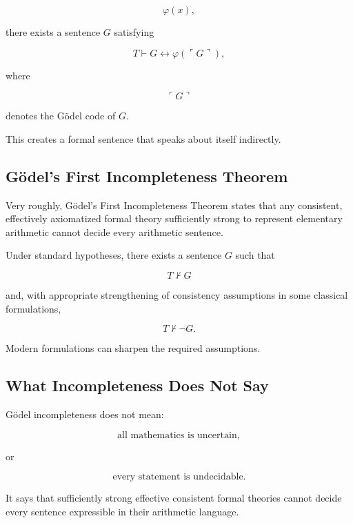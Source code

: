 \[
\varphi(x),
\]

there exists a sentence \(G\) satisfying

\[
\boxed{
T\vdash
G
\leftrightarrow
\varphi(\ulcorner G\urcorner),
}
\]

where

\[
\ulcorner G\urcorner
\]

denotes the Gödel code of \(G\).

This creates a formal sentence that speaks about itself indirectly.

\subsection{Gödel's First Incompleteness Theorem}
\label{subsec:first-incompleteness}

Very roughly, Gödel's First Incompleteness Theorem states that any
consistent, effectively axiomatized formal theory sufficiently strong to
represent elementary arithmetic cannot decide every arithmetic sentence.

Under standard hypotheses, there exists a sentence \(G\) such that

\[
\boxed{
T\nvdash G
}
\]

and, with appropriate strengthening of consistency assumptions in some
classical formulations,

\[
\boxed{
T\nvdash\neg G.
}
\]

Modern formulations can sharpen the required assumptions.

\subsection{What Incompleteness Does Not Say}
\label{subsec:what-incompleteness-does-not-say}

Gödel incompleteness does not mean:

\[
\boxed{
\text{all mathematics is uncertain},
}
\]

or

\[
\boxed{
\text{every statement is undecidable}.
}
\]

It says that sufficiently strong effective consistent formal theories
cannot decide every sentence expressible in their arithmetic language.

